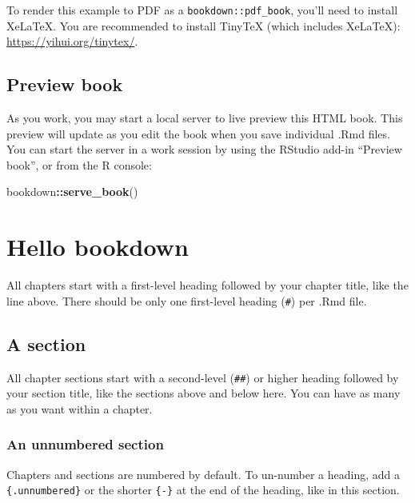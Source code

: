 \documentclass[
]{book}
\newenvironment{Shaded}{\begin{snugshade}}{\end{snugshade}}
\newcommand{\FunctionTok}[1]{\textcolor[rgb]{0.13,0.29,0.53}{\textbf{#1}}}
\newcommand{\NormalTok}[1]{#1}
\newcommand{\SpecialCharTok}[1]{\textcolor[rgb]{0.81,0.36,0.00}{\textbf{#1}}}
\theoremstyle{definition}
\theoremstyle{definition}
\theoremstyle{definition}
\theoremstyle{definition}
\theoremstyle{remark}
\begin{document}
To render this example to PDF as a \texttt{bookdown::pdf\_book}, you'll need to install XeLaTeX. You are recommended to install TinyTeX (which includes XeLaTeX): \url{https://yihui.org/tinytex/}.

\section{Preview book}\label{preview-book}

As you work, you may start a local server to live preview this HTML book. This preview will update as you edit the book when you save individual .Rmd files. You can start the server in a work session by using the RStudio add-in ``Preview book'', or from the R console:

\begin{Shaded}
\begin{Highlighting}[]
\NormalTok{bookdown}\SpecialCharTok{::}\FunctionTok{serve\_book}\NormalTok{()}
\end{Highlighting}
\end{Shaded}

\chapter{Hello bookdown}\label{hello-bookdown}

All chapters start with a first-level heading followed by your chapter title, like the line above. There should be only one first-level heading (\texttt{\#}) per .Rmd file.

\section{A section}\label{a-section}

All chapter sections start with a second-level (\texttt{\#\#}) or higher heading followed by your section title, like the sections above and below here. You can have as many as you want within a chapter.

\subsection*{An unnumbered section}\label{an-unnumbered-section}

Chapters and sections are numbered by default. To un-number a heading, add a \texttt{\{.unnumbered\}} or the shorter \texttt{\{-\}} at the end of the heading, like in this section.
\end{document}
